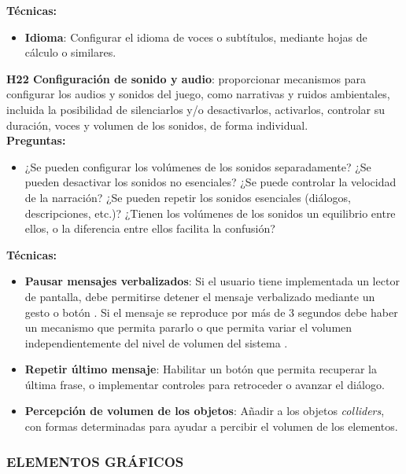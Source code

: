 \textbf{Técnicas:}
\begin{itemize}
	\item \textbf{Idioma}: Configurar el idioma de voces o subtítulos, mediante hojas de cálculo o similares. \cite{LibroBlancoAccesibilidad} 
\end{itemize}
\textbf{H22 Configuración de sonido y audio}: proporcionar mecanismos para configurar los audios y sonidos del juego, como narrativas y ruidos ambientales, incluida la posibilidad de silenciarlos y/o desactivarlos, activarlos, controlar su duración, voces y volumen de los sonidos, de forma individual. \cite{urbanekSoundBananasRules2018} \cite{deborbacamposUsabilityAccessibilityGameplay2016} \cite[p~24]{EN301549-2021}  \cite{teixeiraborgesFairPlayGuidelines2018a}\\
\textbf{Preguntas:}
\begin{itemize}
	\item ¿Se pueden configurar los volúmenes de los sonidos separadamente? ¿Se pueden desactivar los sonidos no esenciales? ¿Se puede controlar la velocidad de la narración? ¿Se pueden repetir los sonidos esenciales (diálogos, descripciones, etc.)? ¿Tienen los volúmenes de los sonidos un equilibrio entre ellos, o la diferencia entre ellos facilita la confusión?
\end{itemize}
\textbf{Técnicas:}
\begin{itemize}
	\item \textbf{Pausar mensajes verbalizados}: Si el usuario tiene implementada un lector de pantalla, debe permitirse detener el mensaje verbalizado mediante un gesto o botón \cite{LibroBlancoAccesibilidad}. Si el mensaje se reproduce por más de 3 segundos debe haber un mecanismo que permita pararlo o que permita variar el volumen independientemente del nivel de volumen del sistema \cite{WebContentAccessibility}.
	\item \textbf{Repetir último mensaje}: Habilitar un botón que permita recuperar la última frase, o implementar controles para retroceder o avanzar el diálogo. \cite{LibroBlancoAccesibilidad} 
	\item \textbf{Percepción de volumen de los objetos}: Añadir a los objetos \textit{colliders}, con formas determinadas para ayudar a percibir el volumen de los elementos. \cite{LibroBlancoAccesibilidad}
\end{itemize}
\subsubsection{ELEMENTOS GRÁFICOS}

